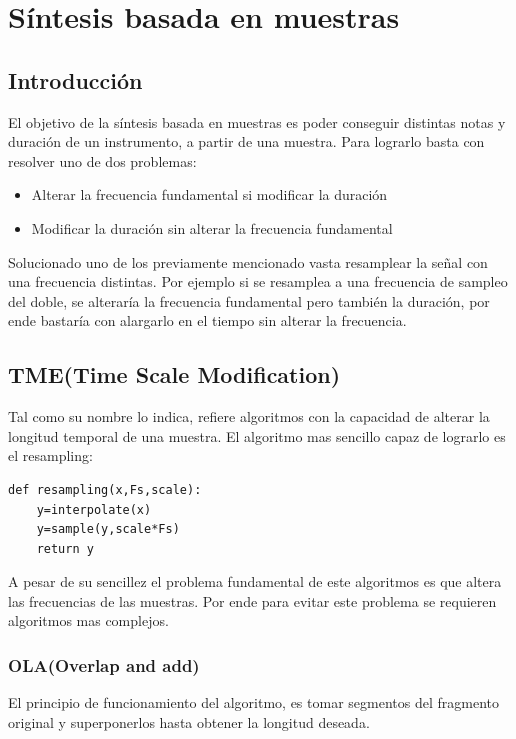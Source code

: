 \documentclass[../ASSD_TP2.tex]{subfiles}
\begin{document}
\section*{Síntesis basada en muestras}
\subsection*{Introducción}
El objetivo de la síntesis basada en muestras es poder conseguir distintas notas y duración de un instrumento, a partir de una muestra. Para lograrlo basta con resolver uno de dos problemas:
\begin{itemize}
\item Alterar la frecuencia fundamental si modificar la duración
\item Modificar la duración sin alterar la frecuencia fundamental
\end{itemize}

Solucionado uno de los previamente mencionado vasta resamplear la se\~nal con una frecuencia distintas. Por ejemplo si se resamplea a una frecuencia de sampleo del doble, se alteraría la frecuencia fundamental pero también la duración, por ende bastaría con alargarlo en el tiempo sin alterar la frecuencia.
\subsection*{TME(Time Scale Modification)}
Tal como su nombre lo indica, refiere  algoritmos con la capacidad de alterar la longitud temporal de una muestra. El algoritmo mas sencillo capaz de lograrlo es el resampling:

\begin{lstlisting}
def resampling(x,Fs,scale):
	y=interpolate(x)
	y=sample(y,scale*Fs)
	return y
\end{lstlisting}
A pesar de su sencillez el problema fundamental de este algoritmos es que altera las frecuencias de las muestras. Por ende para evitar este problema se requieren algoritmos mas complejos.
\subsubsection*{OLA(Overlap and add)}
El principio de funcionamiento del algoritmo, es tomar segmentos del fragmento original y superponerlos hasta obtener la longitud deseada.
\end{document}
